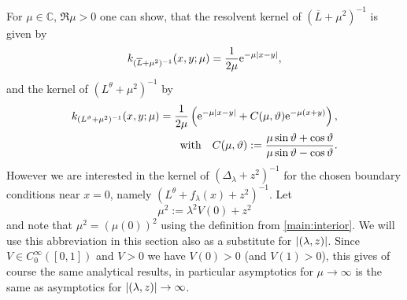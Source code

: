 For $\mu\in\mathbb{C}$, $\Re\mu > 0$ one can show, that the resolvent kernel of
$(\overline L + \mu^2)^{-1}$ is given by
\begin{equation*}
  k_{(\overline L + \mu^2)^{-1}}(x,y;\mu) = \frac1{2\mu}\mathrm e^{-\mu\left|x-y\right|},
\end{equation*}
and the kernel of $(L^\theta+\mu^2)^{-1}$ by
\begin{align}
  \label{frm:k-l-theta}
  k_{(L^\vartheta +\mu^2)^{-1}}(x,y;\mu) = \frac1{2\mu} \left( \mathrm e^{-\mu\left|x-y\right|} +
  C(\mu,\vartheta)\mathrm e^{-\mu(x+y)}\right), \\
  \label{frm:c-mu-theta}
  \text{with} \quad C(\mu,\vartheta) :=
  \frac{\mu\sin\vartheta+\cos\vartheta}{\mu\sin\vartheta-\cos\vartheta}.
\end{align}
However we are interested in the kernel of $(\Delta_\lambda + z^2)^{-1}$ for the
chosen boundary conditions near $x = 0$, namely $(L^\theta + f_\lambda(x) +
z^2)^{-1}$. Let
\begin{equation}
  \label{def:mu}
  \mu^2 := \lambda^2 V(0) + z^2
\end{equation}
and note that $\mu^2 = (\mu(0))^2$ using the definition from
\cref{main:interior}. We will use this abbreviation in this section also as a
substitute for $\left|(\lambda,z)\right|$. Since $V\in C_0^\infty([0,1])$ and $V > 0$
we have $V(0) > 0$ (and $V(1) > 0$), this gives of course the same analytical
results, in particular asymptotics for $\mu\to\infty$ is the same as asymptotics
for $\left|(\lambda,z)\right|\to\infty$.

